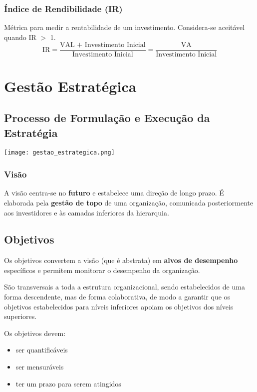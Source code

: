 \documentclass[11pt]{article}
\begin{document}
\subsubsection{Índice de Rendibilidade (IR)}

Métrica para medir a rentabilidade de um investimento. Considera-se aceitável quando IR $>$ 1.
\begin{equation*}
    \text{IR} = \frac{\text{VAL + Investimento Inicial}}{\text{Investimento Inicial}}
    = \frac{\text{VA}}{\text{Investimento Inicial}}
\end{equation*}

\newpage

\section{Gestão Estratégica}

\subsection{Processo de Formulação e Execução da Estratégia}

\texttt{[image: gestao\_estrategica.png]}

\subsubsection{Visão}

A visão centra-se no \textbf{futuro} e estabelece uma direção de longo prazo. É elaborada pela \textbf{gestão de topo} de uma organização, comunicada posteriormente aos investidores e às camadas inferiores da hierarquia.

\subsection{Objetivos}

Os objetivos convertem a visão (que é abstrata) em \textbf{alvos de desempenho} específicos e permitem monitorar o desempenho da organização.

São transversais a toda a estrutura organizacional, sendo estabelecidos de uma forma descendente, mas de forma colaborativa, de modo a garantir que os objetivos estabelecidos para níveis inferiores apoiam os objetivos dos níveis superiores.

Os objetivos devem:
\begin{itemize}[topsep=-4pt,itemsep=0pt]
    \item ser quantificáveis
    \item ser mensuráveis
    \item ter um prazo para serem atingidos
\end{itemize}
\end{document}
